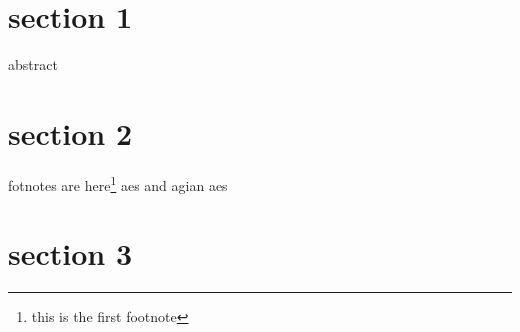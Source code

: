 
\section{section 1}
abstract\cite{wikipedia_2022}

\section{section 2}

fotnotes are here\footnote{this is the first footnote}
aes and agian aes

\section{section 3}